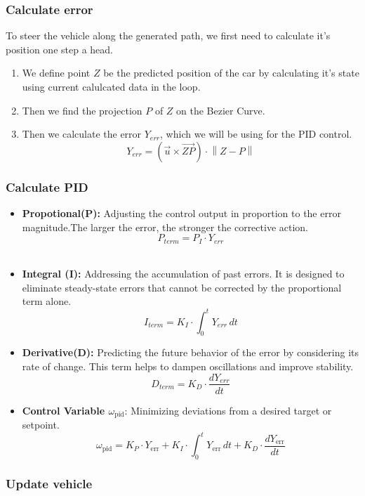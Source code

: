     \subsubsection*{Calculate error}
    To steer the vehicle along the generated path, we first need to calculate it's position one step a head.
    \begin{enumerate}
      \item We define point $Z$ be the predicted position of the car by calculating it's state using current calulcated data in the loop.
      \item Then we find the projection $P$ of $Z$ on the Bezier Curve.
      \item Then we calculate the error $Y_{err}$, which we will be using for the PID control.
      $$Y_{err}=(\vec{u}\times\vec{ZP})\cdot\left\lVert Z - P\right\rVert$$
    \end{enumerate}
    

    \subsubsection*{Calculate PID}
    \begin{itemize}
      \item \textbf{Propotional(P):} Adjusting the control output in proportion to the error magnitude.The larger the error, the stronger the corrective action.\\
        $$P_{term}=P_I \cdot Y_{err}$$\\
      \item \textbf{Integral (I):} Addressing the accumulation of past errors. It is designed to eliminate steady-state errors that cannot be corrected by the proportional term alone.\\
        $$I_{term} = K_I \cdot \int_{0}^{t} Y_{err} \, dt$$
      \item \textbf{Derivative(D):} Predicting the future behavior of the error by considering its rate of change. This term helps to dampen oscillations and improve stability.\\
        $$D_{term} = K_D\cdot\frac{d Y_{err}}{dt}$$   
    \item \textbf{Control Variable $\omega_{\text{pid}}$}: Minimizing deviations from a desired target or setpoint.
        $$\omega_{\text{pid}} = K_P \cdot Y_{\text{err}} + K_I \cdot \int_{0}^{t} Y_{\text{err}} \, dt + K_D \cdot \frac{dY_{\text{err}}}{dt}$$
    \end{itemize}
    \subsubsection*{Update vehicle}
